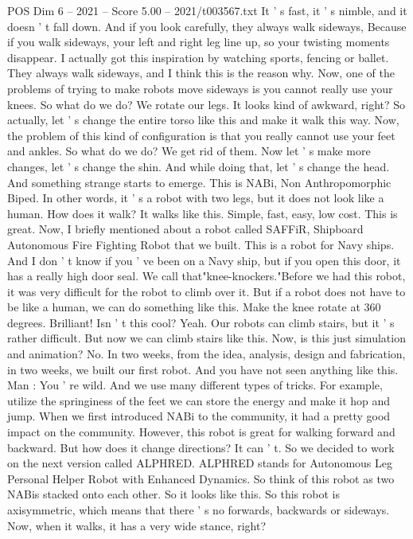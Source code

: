 \begin{textsample}{POS Dim 6 – 2021 – Score 5.00 – 2021/t003567.txt}
It ' s fast, it ' s nimble, and it doesn ' t fall down.
And if you look carefully, they always walk sideways, Because if you walk sideways, your left and right leg line up, so your twisting moments disappear.
I actually got this inspiration by watching sports, fencing or ballet.
They always walk sideways, and I think this is the reason why.
Now, one of the problems of trying to make robots move sideways is you cannot really use your knees.
So what do we do?
We rotate our legs.
It looks kind of awkward, right?
So actually, let ' s change the entire torso like this and make it walk this way.
Now, the problem of this kind of configuration is that you really cannot use your feet and ankles.
So what do we do?
We get rid of them.
Now let ' s make more changes, let ' s change the shin.
And while doing that, let ' s change the head.
And something strange starts to emerge.
This is NABi, Non Anthropomorphic Biped.
In other words, it ' s a robot with two legs, but it does not look like a human.
How does it walk?
It walks like this.
Simple, fast, easy, low cost.
This is great.
Now, I briefly mentioned about a robot called SAFFiR, Shipboard Autonomous Fire Fighting Robot that we built.
This is a robot for Navy ships.
And I don ' t know if you ' ve been on a Navy ship, but if you open this door, it has a really high door seal.
We call that"knee-knockers."Before we had this robot, it was very difficult for the robot to climb over it.
But if a robot does not have to be like a human, we can do something like this.
Make the knee rotate at 360 degrees.
Brilliant!
Isn ' t this cool?
Yeah.
Our robots can climb stairs, but it ' s rather difficult.
But now we can climb stairs like this.
Now, is this just simulation and animation?
No.
In two weeks, from the idea, analysis, design and fabrication, in two weeks, we built our first robot.
And you have not seen anything like this.
Man : You ' re wild.
And we use many different types of tricks.
For example, utilize the springiness of the feet we can store the energy and make it hop and jump.
When we first introduced NABi to the community, it had a pretty good impact on the community.
However, this robot is great for walking forward and backward.
But how does it change directions?
It can ' t.
So we decided to work on the next version called ALPHRED.
ALPHRED stands for Autonomous Leg Personal Helper Robot with Enhanced Dynamics.
So think of this robot as two NABis stacked onto each other.
So it looks like this.
So this robot is axisymmetric, which means that there ' s no forwards, backwards or sideways.
Now, when it walks, it has a very wide stance, right?

\end{textsample}
